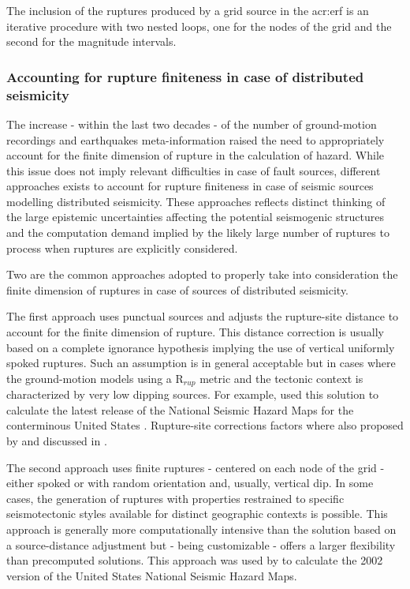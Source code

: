 The inclusion of the ruptures produced by a grid source in the 
\gls{acr:erf} is an iterative procedure with two nested loops, one 
for the nodes of the grid and the second for the magnitude intervals. 
%
\subsubsection{Accounting for rupture finiteness in case of distributed 
seismicity}
% 
The increase - within the last two decades - of the number of 
ground-motion recordings and earthquakes meta-information raised 
the need to appropriately account for the finite dimension of rupture 
in the calculation of hazard.
% 
While this issue does not imply relevant difficulties in case of 
fault sources, different approaches exists to account for rupture 
finiteness in case of seismic sources modelling distributed 
seismicity. 
% 
These approaches reflects distinct thinking of the 
large epistemic uncertainties affecting the potential seismogenic 
structures and the computation demand implied by the likely 
large number of ruptures to process when ruptures are explicitly
considered.

Two are the common approaches adopted to properly take into 
consideration the finite dimension of ruptures in case of sources 
of distributed seismicity.

The first approach uses punctual sources and adjusts the 
rupture-site distance to account for the finite dimension of rupture.
%
This distance correction is usually based on a complete ignorance 
hypothesis implying the use of vertical uniformly spoked ruptures.
%
Such an assumption is in general acceptable but in cases where the 
ground-motion models using a R$_{rup}$ metric and the tectonic context
is characterized by very low dipping sources.
%
For example, \citet{petersen2008} used this solution to calculate
the latest release of the National Seismic Hazard Maps for the 
conterminous United States \citep[see also][]{harmsen2008}. 
%
Rupture-site corrections factors where also proposed by 
\citet{scherbaum2004} and discussed in \citet{beyer2006}.

The second approach uses finite ruptures - centered on each node 
of the grid - either spoked or with random orientation and,  
usually, vertical dip. 
%
In some cases, the generation of ruptures with properties 
restrained to specific seismotectonic styles available for distinct  
geographic contexts is possible. 
%
This approach is generally more computationally intensive than the 
solution based on a source-distance adjustment but - being 
customizable - offers a larger flexibility than precomputed solutions.
%
This approach was used by \citet{frankel2002} to calculate the 2002
version of the United States National Seismic Hazard Maps.
%
